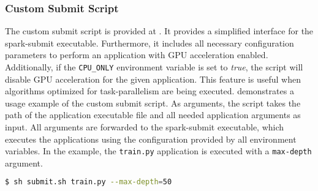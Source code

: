 \subsubsection{Custom Submit Script}
The custom submit script is provided at . It provides a simplified interface for the spark-submit executable. Furthermore, it includes all necessary configuration parameters to perform an application with GPU acceleration enabled. Additionally, if the \texttt{CPU\_ONLY} environment variable is set to \textit{true}, the script will disable GPU acceleration for the given application.
This feature is useful when algorithms optimized for task-parallelism are being executed.
 demonstrates a usage example of the custom submit script.
As arguments, the script takes the path of the application executable file and all needed application arguments as input. All arguments are forwarded to the spark-submit executable, which executes the applications using the configuration provided by all environment variables. In the example, the \texttt{train.py} application is executed with a \texttt{max-depth} argument. 
\begin{lstlisting}[label=lst:06_env_depl_submit, caption=Usage of the submit script, language=bash, numbers=none]
$ sh submit.sh train.py --max-depth=50
\end{lstlisting}


